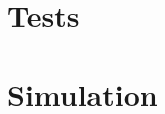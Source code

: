 \documentclass[a4paper,10pt]{article}
\begin{document}
\newpage
\section{Tests}
\subsection{}

\subsection{}

\subsection{}

\newpage
\section{Simulation}
\subsection{}

\subsection{}

\subsection{}
\end{document}
